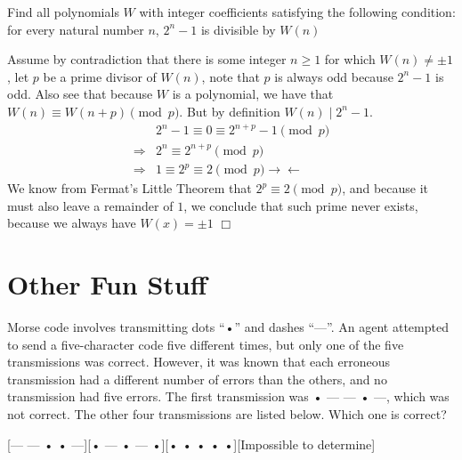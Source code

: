 \begin{problem}[M][6][Polish 2003]
    Find all polynomials $W$ with integer coefficients satisfying the following condition: for every natural number $n$, $2^n-1$ is divisible by $W(n)$
\end{problem}

\begin{solution}[$W(x) \equiv \pm 1$]
    Assume by contradiction that there is some integer $n \geq 1$ for which $W(n) \neq \pm 1$, let $p$ be a prime divisor of $W(n)$, note that $p$ is always odd because $2^n-1$ is odd. Also see that because $W$ is a polynomial, we have that $W(n) \equiv W(n + p) \pmod p$. But by definition $W(n) \mid 2^n - 1$. 
    \begin{align*}
    & 2^{n}-1 \equiv 0 \equiv 2^{n+p} -1 \pmod p \\
    \Rightarrow& 2^n \equiv 2^{n+p} \pmod p \\
    \Rightarrow& 1 \equiv 2^p \equiv 2 \pmod p \rightarrow \leftarrow
    \end{align*}
    We know from Fermat's Little Theorem that $2^p \equiv 2 \pmod p$, and because it must also leave a remainder of $1$, we conclude that such prime never exists, because we always have $W(x) = \pm 1$ $\Box$
\end{solution}

\section{Other Fun Stuff}\setcounter{problem}{0}

\begin{problem}
     Morse code involves transmitting dots “•” and dashes “\textsf{---}”. An agent attempted to send a five-character code five different times, but only one of the five transmissions was correct. However, it was known that each erroneous transmission had a different number of errors than the others, and no transmission had five errors. The first transmission was • \textsf{---} \textsf{---} • \textsf{---}, which was not correct. The other four transmissions are listed below. Which one is correct? 
\end{problem}
[\textsf{---} \textsf{---} • • \textsf{---}][• \textsf{---} • \textsf{---} •][• • • • •][Impossible to determine]

